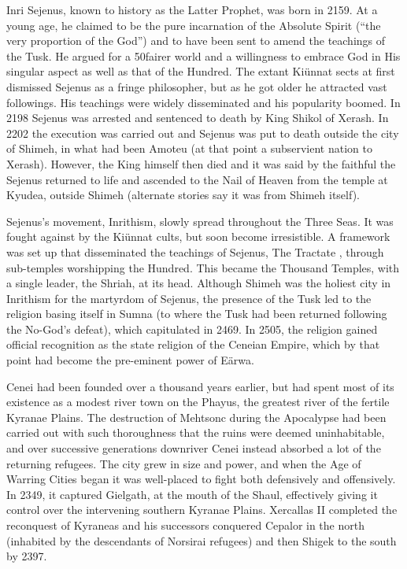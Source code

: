 \documentclass[]{book}
\begin{document}
Inri Sejenus, known to history as the Latter Prophet, was born in 2159. At a young age,
he claimed to be the pure incarnation of the Absolute Spirit (``the very proportion of
the God'') and to have been sent to amend the teachings of the Tusk. He argued for a
50fairer world and a willingness to embrace God in His singular aspect as well as that of
the Hundred. The extant Kiünnat sects at first dismissed Sejenus as a fringe
philosopher, but as he got older he attracted vast followings. His teachings were widely
disseminated and his popularity boomed. In 2198 Sejenus was arrested and sentenced
to death by King Shikol of Xerash. In 2202 the execution was carried out and Sejenus
was put to death outside the city of Shimeh, in what had been Amoteu (at that point a
subservient nation to Xerash). However, the King himself then died and it was said by
the faithful the Sejenus returned to life and ascended to the Nail of Heaven from the
temple at Kyudea, outside Shimeh (alternate stories say it was from Shimeh itself).

Sejenus's movement, Inrithism, slowly spread throughout the Three Seas. It was fought
against by the Kiünnat cults, but soon become irresistible. A framework was set up that
disseminated the teachings of Sejenus, The Tractate , through sub-temples worshipping
the Hundred. This became the Thousand Temples, with a single leader, the Shriah, at
its head. Although Shimeh was the holiest city in Inrithism for the martyrdom of
Sejenus, the presence of the Tusk led to the religion basing itself in Sumna (to where
the Tusk had been returned following the No-God's defeat), which capitulated in 2469.
In 2505, the religion gained official recognition as the state religion of the Ceneian
Empire, which by that point had become the pre-eminent power of Eärwa.

Cenei had been founded over a thousand years earlier, but had spent most of its
existence as a modest river town on the Phayus, the greatest river of the fertile Kyranae
Plains. The destruction of Mehtsonc during the Apocalypse had been carried out with
such thoroughness that the ruins were deemed uninhabitable, and over successive
generations downriver Cenei instead absorbed a lot of the returning refugees. The city
grew in size and power, and when the Age of Warring Cities began it was well-placed to
fight both defensively and offensively. In 2349, it captured Gielgath, at the mouth of
the Shaul, effectively giving it control over the intervening southern Kyranae Plains.
Xercallas II completed the reconquest of Kyraneas and his successors conquered
Cepalor in the north (inhabited by the descendants of Norsirai refugees) and then
Shigek to the south by 2397.
\end{document}
